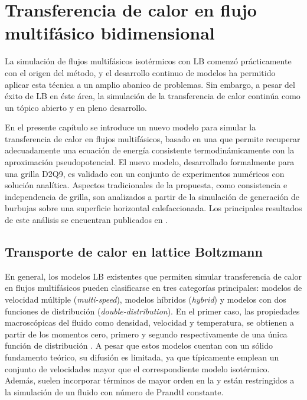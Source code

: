 \chapter{Transferencia de calor en flujo multif\'asico bidimensional}
\label{chap:modelo2D}

La simulaci\'on de flujos multif\'asicos isot\'ermicos con LB comenz\'o pr\'acticamente con el origen del m\'etodo, y el desarrollo continuo de modelos ha permitido aplicar esta t\'ecnica a un amplio abanico de problemas. Sin embargo, a pesar del \'exito de LB en \'este \'area, la simulaci\'on de la transferencia de calor contin\'ua como un t\'opico abierto y en pleno desarrollo.

En el presente cap\'itulo se introduce un nuevo modelo para simular la transferencia de calor en flujos multif\'asicos, basado en una \lbe{} que permite recuperar adecuadamente una ecuaci\'on de energ\'ia consistente termodin\'amicamente con la aproximaci\'on pseudopotencial. El nuevo modelo, desarrollado formalmente para una grilla D2Q9, es validado con un conjunto de experimentos num\'ericos con soluci\'on anal\'itica. Aspectos tradicionales de la propuesta, como consistencia e independencia de grilla, son analizados a partir de la simulaci\'on de generaci\'on de burbujas sobre una superficie horizontal calefaccionada. Los principales resultados de este an\'alisis se encuentran publicados en \cite{fogliatto_assessment_2021}.


\section{Transporte de calor en lattice Boltzmann}

En general, los modelos LB existentes que permiten simular transferencia de calor en flujos multif\'asicos pueden clasificarse en tres categor\'ias principales: modelos de velocidad m\'ultiple (\emph{multi-speed}), modelos h\'ibridos (\emph{hybrid}) y modelos con dos funciones de distribuci\'on (\emph{double-distribution}). En el primer caso, las propiedades macrosc\'opicas del fluido como densidad, velocidad y temperatura, se obtienen a partir de los momentos cero, primero y segundo respectivamente de una \'unica funci\'on de distribuci\'on \cite{succi_lattice_2018,alexander_lattice_1993}. A pesar que estos modelos cuentan con un s\'olido fundamento te\'orico, su difusi\'on es limitada, ya que t\'ipicamente emplean un conjunto de velocidades mayor que el correspondiente modelo isot\'ermico. Adem\'as, suelen incorporar t\'erminos de mayor orden en la \edf{} y est\'an restringidos a la simulaci\'on de un fluido con n\'umero de Prandtl constante.

